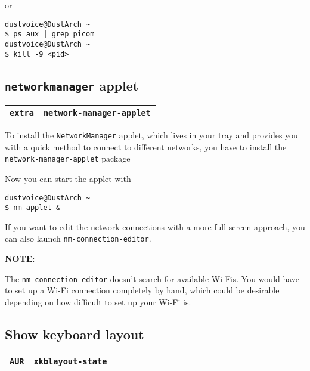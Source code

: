 \documentclass[9pt]{report}
\newcommand{\admonition}[2]{\textbf{#1}: {#2}}
\begin{document}
or

\begin{verbatim}
dustvoice@DustArch ~
$ ps aux | grep picom
dustvoice@DustArch ~
$ kill -9 <pid>
\end{verbatim}

\vfill\eject

\hypertarget{x-networkmanager-applet}{\subsection{\texttt{networkmanager} applet}}
\begin{center}
\begin{tabular}{|c|c|}
\hline
\texttt{extra} & \texttt{network-manager-applet} \\ 
\hline
\end{tabular}
\end{center}

To install the \texttt{NetworkManager} applet, which lives in your tray and provides you with a quick method to connect to different networks, you have to install the \texttt{network-manager-applet} package


Now you can start the applet with


\begin{verbatim}
dustvoice@DustArch ~
$ nm-applet &
\end{verbatim}

If you want to edit the network connections with a more full screen approach, you can also launch \texttt{nm-connection-editor}.


\admonition{NOTE}{The \texttt{nm-connection-editor} doesn’t search for available Wi-Fis.
You would have to set up a Wi-Fi connection completely by hand, which could be desirable depending on how difficult to set up your Wi-Fi is.

}

\vfill\eject

\hypertarget{x-show-keyboard-layout}{\subsection{Show keyboard layout}}
\begin{center}
\begin{tabular}{|c|c|}
\hline
\texttt{AUR} & \texttt{xkblayout-state} \\ 
\hline
\end{tabular}
\end{center}
\end{document}
